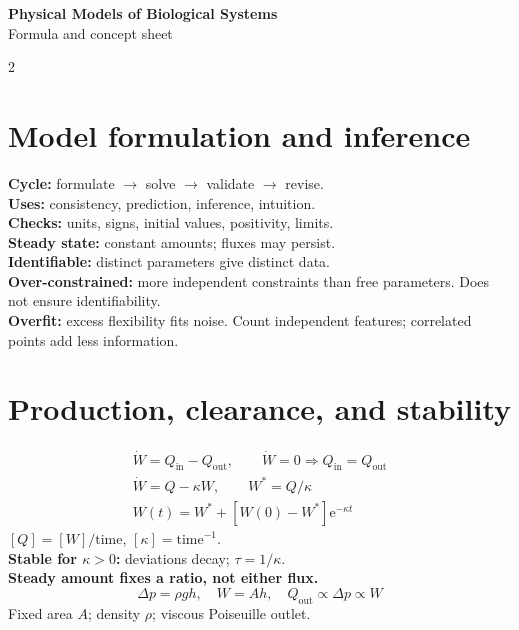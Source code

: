 \documentclass[10pt,a4paper]{scrartcl}
\newcommand{\ee}{\mathrm{e}}
\begin{document}
\begin{center}
{\large\bfseries Physical Models of Biological Systems}\\[-1pt]
{\small Formula and concept sheet}
\end{center}
\vspace{-5pt}
\begin{multicols}{2}
\raggedcolumns
\small
\section*{Model formulation and inference}
\textbf{Cycle:} formulate $\to$ solve $\to$ validate $\to$ revise.\\
\textbf{Uses:} consistency, prediction, inference, intuition.\\
\textbf{Checks:} units, signs, initial values, positivity, limits.\\
\textbf{Steady state:} constant amounts; fluxes may persist.\\
\textbf{Identifiable:} distinct parameters give distinct data.\\
\textbf{Over-constrained:} more independent constraints than free parameters. Does not ensure identifiability.\\
\textbf{Overfit:} excess flexibility fits noise. Count independent features; correlated points add less information.

\section*{Production, clearance, and stability}
\begin{gather*}
\dot W=Q_{\mathrm{in}}-Q_{\mathrm{out}},\qquad
\dot W=0\Rightarrow Q_{\mathrm{in}}=Q_{\mathrm{out}}\\
\dot W=Q-\kappa W,\qquad W^*=Q/\kappa\\
W(t)=W^*+[W(0)-W^*]\ee^{-\kappa t}
\end{gather*}
$[Q]=[W]/\text{time}$, $[\kappa]=\text{time}^{-1}$.\\
\textbf{Stable for $\kappa>0$:} deviations decay; $\tau=1/\kappa$.\\
\textbf{Steady amount fixes a ratio, not either flux.}
\begin{equation*}
\Delta p=\rho gh,\quad W=Ah,\quad Q_{\mathrm{out}}\propto\Delta p\propto W
\end{equation*}
Fixed area $A$; density $\rho$; viscous Poiseuille outlet.


\end{multicols}
\end{document}
